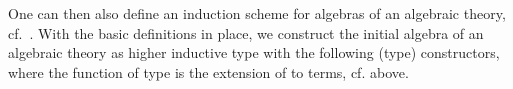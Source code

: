 \documentclass{easychair}
\begin{document}
One can then also define an induction scheme for algebras of an algebraic
theory, cf.~\cite{HermidaJacobs97:IndCoindFib}.
With the basic definitions in place, we construct the initial algebra of
an algebraic theory as higher inductive type with the following
(type) constructors, where the function
 of type
\toA {}
is the extension of  to terms,
cf.  above.
\begin{code}%
\>[6]\AgdaSpace{}%
\>[13]\AgdaSymbol{:}\AgdaSpace{}%
\AgdaSpace{}%
\AgdaSymbol{\{}\AgdaSpace{}%
\AgdaSpace{}%
\AgdaSymbol{\}}\AgdaSpace{}%
\AgdaSymbol{(}\AgdaSpace{}%
\AgdaSymbol{:}\AgdaSpace{}%
\AgdaSpace{}%
\AgdaSpace{}%
\AgdaSpace{}%
\AgdaSymbol{)}\AgdaSpace{}%
\AgdaSpace{}%
\AgdaSpace{}%
\<%
\\
%
\>[6]%
\>[13]\AgdaSymbol{:}\AgdaSpace{}%
\AgdaSymbol{(}\AgdaSpace{}%
\AgdaSymbol{:}\AgdaSpace{}%

\end{code}
\end{document}
